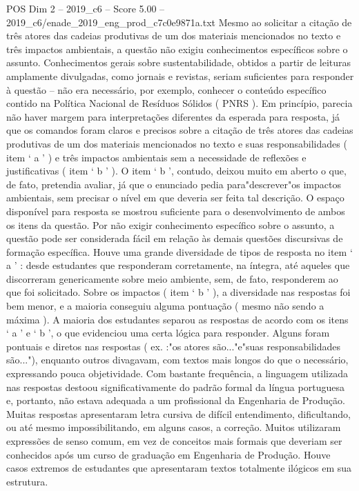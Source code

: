 \begin{textsample}{POS Dim 2 – 2019\_c6 – Score 5.00 – 2019\_c6/enade\_2019\_eng\_prod\_c7c0e9871a.txt}
Mesmo ao solicitar a citação de três atores das cadeias produtivas de um dos materiais mencionados no texto e três impactos ambientais, a questão não exigiu conhecimentos específicos sobre o assunto.
Conhecimentos gerais sobre sustentabilidade, obtidos a partir de leituras amplamente divulgadas, como jornais e revistas, seriam suficientes para responder à questão – não era necessário, por exemplo, conhecer o conteúdo específico contido na Política Nacional de Resíduos Sólidos ( PNRS ).
Em princípio, parecia não haver margem para interpretações diferentes da esperada para resposta, já que os comandos foram claros e precisos sobre a citação de três atores das cadeias produtivas de um dos materiais mencionados no texto e suas responsabilidades ( item ‘ a ’ ) e três impactos ambientais sem a necessidade de reflexões e justificativas ( item ‘ b ’ ).
O item ‘ b ’, contudo, deixou muito em aberto o que, de fato, pretendia avaliar, já que o enunciado pedia para"descrever"os impactos ambientais, sem precisar o nível em que deveria ser feita tal descrição.
O espaço disponível para resposta se mostrou suficiente para o desenvolvimento de ambos os itens da questão.
Por não exigir conhecimento específico sobre o assunto, a questão pode ser considerada fácil em relação às demais questões discursivas de formação específica.
Houve uma grande diversidade de tipos de resposta no item ‘ a ’ : desde estudantes que responderam corretamente, na íntegra, até aqueles que discorreram genericamente sobre meio ambiente, sem, de fato, responderem ao que foi solicitado.
Sobre os impactos ( item ‘ b ’ ), a diversidade nas respostas foi bem menor, e a maioria conseguiu alguma pontuação ( mesmo não sendo a máxima ).
A maioria dos estudantes separou as respostas de acordo com os itens ‘ a ’ e ‘ b ’, o que evidenciou uma certa lógica para responder.
Alguns foram pontuais e diretos nas respostas ( ex. :"os atores são..."e"suas responsabilidades são..."), enquanto outros divagavam, com textos mais longos do que o necessário, expressando pouca objetividade.
Com bastante frequência, a linguagem utilizada nas respostas destoou significativamente do padrão formal da língua portuguesa e, portanto, não estava adequada a um profissional da Engenharia de Produção.
Muitas respostas apresentaram letra cursiva de difícil entendimento, dificultando, ou até mesmo impossibilitando, em alguns casos, a correção.
Muitos utilizaram expressões de senso comum, em vez de conceitos mais formais que deveriam ser conhecidos após um curso de graduação em Engenharia de Produção.
Houve casos extremos de estudantes que apresentaram textos totalmente ilógicos em sua estrutura.

\end{textsample}
